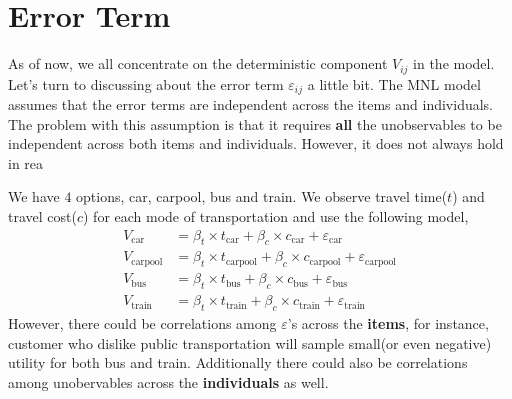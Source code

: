 \documentclass[11pt]{article}
\newenvironment{example}[2][Example]{\begin{trivlist}
\item[\hskip \labelsep {\bfseries #1}\hskip \labelsep {\bfseries #2.}]}{\end{trivlist}}
\begin{document}
\section{Error Term}
As of now, we all concentrate on the deterministic component $V_{ij}$ in the model. Let's turn to discussing about the error term $\varepsilon_{ij}$ a little bit. The MNL model assumes that the error terms are independent across the items and individuals. The problem with this assumption is that it requires \textbf{all} the unobservables to be independent across both items and individuals. However, it does not always hold in rea
\begin{example}[Example] 3
We have $4$ options, car, carpool, bus and train. We observe travel time($t$) and travel cost($c$) for each mode of transportation and use the following model,
\begin{align*}
V_{\text{car}} &= \beta_t \times t_{\text{car}} + \beta_c \times c_{\text{car}} + \varepsilon_{\text{car}}\\
V_{\text{carpool}} &= \beta_t \times t_{\text{carpool}} + \beta_c \times c_{\text{carpool}} + \varepsilon_{\text{carpool}}\\
V_{\text{bus}} &= \beta_t \times t_{\text{bus}} + \beta_c \times c_{\text{bus}} + \varepsilon_{\text{bus}}\\
V_{\text{train}} &= \beta_t \times t_{\text{train}} + \beta_c \times c_{\text{train}} + \varepsilon_{\text{train}}
\end{align*}
However, there could be correlations among $\varepsilon$'s across the \textbf{items}, for instance, customer who dislike public transportation will sample small(or even negative) utility for both bus and train. Additionally there could also be correlations among unobervables across the \textbf{individuals} as well. 
\end{example}
\end{document}
